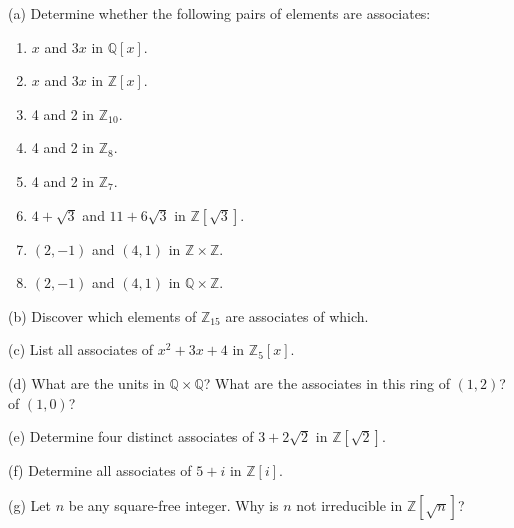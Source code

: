 \begin{problem}[Warmup]{(a)}
    Determine whether the following pairs of elements are associates:
    \begin{enumerate}
        \item[(a)] $x$ and $3x$ in $\mathbb{Q}[x]$.
        \item[(b)] $x$ and $3x$ in $\mathbb{Z}[x]$.
        \item[(c)] 4 and 2 in $\mathbb{Z}_{10}$.
        \item[(d)] 4 and 2 in $\mathbb{Z}_8$.
        \item[(e)] 4 and 2 in $\mathbb{Z}_7$.
        \item[(f)] $4 + \sqrt{3}$ and $11 + 6\sqrt{3}$ in $\mathbb{Z}[\sqrt{3}]$.
        \item[(g)] $(2, -1)$ and $(4, 1)$ in $\mathbb{Z} \times \mathbb{Z}$.
        \item[(h)] $(2, -1)$ and $(4, 1)$ in $\mathbb{Q} \times \mathbb{Z}$.
    \end{enumerate}
\end{problem}
\unsolved

\begin{problem}[Warmup]{(b)}
    Discover which elements of $\mathbb{Z}_{15}$ are associates of which.
\end{problem}
\unsolved

\begin{problem}[Warmup]{(c)}
    List all associates of $x^2 + 3x + 4$ in $\mathbb{Z}_5[x]$.
\end{problem}
\unsolved

\begin{problem}[Warmup]{(d)}
    What are the units in $\mathbb{Q} \times \mathbb{Q}$? What are the associates in this ring of $(1, 2)$? of $(1, 0)$?
\end{problem}
\unsolved

\begin{problem}[Warmup]{(e)}
    Determine four distinct associates of $3 + 2\sqrt{2}$ in $\mathbb{Z}[\sqrt{2}]$.
\end{problem}
\unsolved

\begin{problem}[Warmup]{(f)}
    Determine all associates of $5 + i$ in $\mathbb{Z}[i]$.
\end{problem}
\unsolved

\begin{problem}[Warmup]{(g)}
    Let $n$ be any square-free integer. Why is $n$ not irreducible in $\mathbb{Z}[\sqrt{n}]$?
\end{problem}
\unsolved

